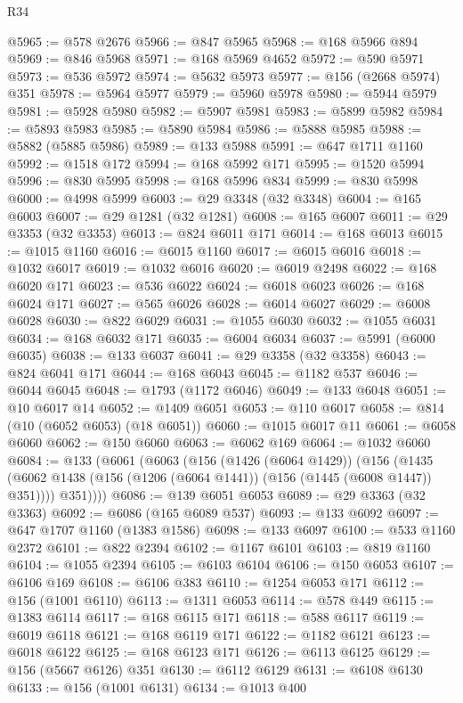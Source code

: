 \begin{lexlean}{R34}
\begin{coremodule}
@5965 := @578 @2676
@5966 := @847 @5965
@5968 := @168 @5966 @894
@5969 := @846 @5968
@5971 := @168 @5969 @4652
@5972 := @590 @5971
@5973 := @536 @5972
@5974 := @5632 @5973
@5977 := @156 (@2668 @5974) @351
@5978 := @5964 @5977
@5979 := @5960 @5978
@5980 := @5944 @5979
@5981 := @5928 @5980
@5982 := @5907 @5981
@5983 := @5899 @5982
@5984 := @5893 @5983
@5985 := @5890 @5984
@5986 := @5888 @5985
@5988 := @5882 (@5885 @5986)
@5989 := @133 @5988
@5991 := @647 @1711 @1160
@5992 := @1518 @172
@5994 := @168 @5992 @171
@5995 := @1520 @5994
@5996 := @830 @5995
@5998 := @168 @5996 @834
@5999 := @830 @5998
@6000 := @4998 @5999
@6003 := @29 @3348 (@32 @3348)
@6004 := @165 @6003
@6007 := @29 @1281 (@32 @1281)
@6008 := @165 @6007
@6011 := @29 @3353 (@32 @3353)
@6013 := @824 @6011 @171
@6014 := @168 @6013
@6015 := @1015 @1160
@6016 := @6015 @1160
@6017 := @6015 @6016
@6018 := @1032 @6017
@6019 := @1032 @6016
@6020 := @6019 @2498
@6022 := @168 @6020 @171
@6023 := @536 @6022
@6024 := @6018 @6023
@6026 := @168 @6024 @171
@6027 := @565 @6026
@6028 := @6014 @6027
@6029 := @6008 @6028
@6030 := @822 @6029
@6031 := @1055 @6030
@6032 := @1055 @6031
@6034 := @168 @6032 @171
@6035 := @6004 @6034
@6037 := @5991 (@6000 @6035)
@6038 := @133 @6037
@6041 := @29 @3358 (@32 @3358)
@6043 := @824 @6041 @171
@6044 := @168 @6043
@6045 := @1182 @537
@6046 := @6044 @6045
@6048 := @1793 (@1172 @6046)
@6049 := @133 @6048
@6051 := @10 @6017 @14
@6052 := @1409 @6051
@6053 := @110 @6017
@6058 := @814 (@10 (@6052 @6053) (@18 @6051))
@6060 := @1015 @6017 @11
@6061 := @6058 @6060
@6062 := @150 @6060
@6063 := @6062 @169
@6064 := @1032 @6060
@6084 := @133
    (@6061
      (@6063
        (@156
          (@1426 (@6064 @1429))
          (@156
            (@1435 (@6062 @1438 (@156 (@1206 (@6064 @1441)) (@156 (@1445 (@6008 @1447)) @351))))
            @351))))
@6086 := @139 @6051 @6053
@6089 := @29 @3363 (@32 @3363)
@6092 := @6086 (@165 @6089 @537)
@6093 := @133 @6092
@6097 := @647 @1707 @1160 (@1383 @1586)
@6098 := @133 @6097
@6100 := @533 @1160 @2372
@6101 := @822 @2394
@6102 := @1167 @6101
@6103 := @819 @1160
@6104 := @1055 @2394
@6105 := @6103 @6104
@6106 := @150 @6053
@6107 := @6106 @169
@6108 := @6106 @383
@6110 := @1254 @6053 @171
@6112 := @156 (@1001 @6110)
@6113 := @1311 @6053
@6114 := @578 @449
@6115 := @1383 @6114
@6117 := @168 @6115 @171
@6118 := @588 @6117
@6119 := @6019 @6118
@6121 := @168 @6119 @171
@6122 := @1182 @6121
@6123 := @6018 @6122
@6125 := @168 @6123 @171
@6126 := @6113 @6125
@6129 := @156 (@5667 @6126) @351
@6130 := @6112 @6129
@6131 := @6108 @6130
@6133 := @156 (@1001 @6131)
@6134 := @1013 @400

\end{coremodule}
\end{lexlean}
